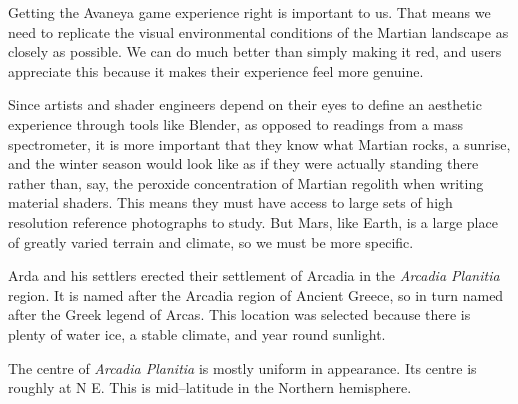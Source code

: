 



    {}
Getting the Avaneya game experience right is important to us. That means we need to replicate the visual environmental conditions of the Martian landscape as closely as possible. We can do much better than simply making it red, and users appreciate this because it makes their experience feel more genuine.

Since artists and shader engineers depend on their eyes to define an aesthetic experience through tools like Blender, as opposed to readings from a mass spectrometer, it is more important that they know what Martian rocks, a sunrise, and the winter season would look like as if they were actually standing there rather than, say, the peroxide concentration of Martian regolith when writing material shaders. This means they must have access to large sets of high resolution reference photographs to study. But Mars, like Earth, is a large place of greatly varied terrain and climate, so we must be more specific.

Arda and his settlers erected their settlement of Arcadia in the {\it Arcadia Planitia} region. It is named after the Arcadia region of Ancient Greece, so in turn named after the Greek legend of Arcas. This location was selected because there is plenty of water ice, a stable climate, and year round sunlight.

The centre of {\it Arcadia Planitia} is mostly uniform in appearance. Its centre is roughly at N E. This is mid--latitude in the Northern hemisphere. 

